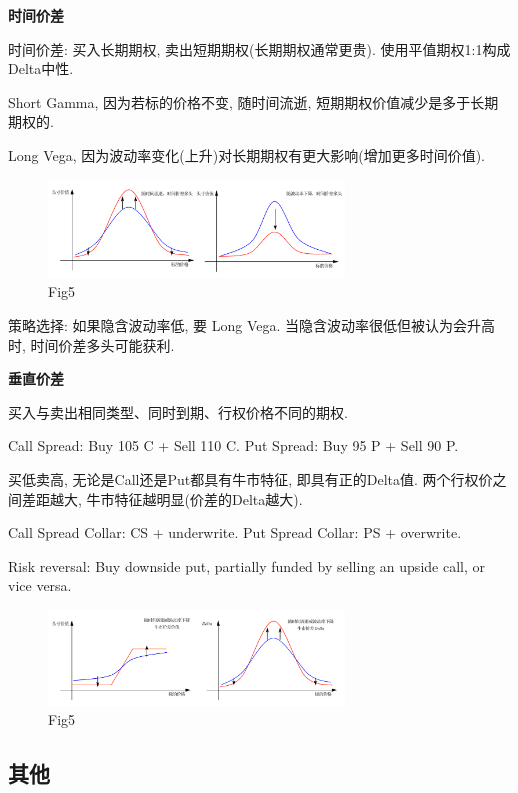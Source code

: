 \documentclass[UTF8]{ctexart}
\begin{document}
\noindent \textbf{时间价差} \par

时间价差: 买入长期期权, 卖出短期期权(长期期权通常更贵).
使用平值期权1:1构成Delta中性.

Short Gamma, 因为若标的价格不变, 随时间流逝, 短期期权价值减少是多于长期期权的.

Long Vega, 因为波动率变化(上升)对长期期权有更大影响(增加更多时间价值).

\begin{figure}[H]
	\centering
	\includegraphics[width=0.7\textwidth]{fig/fig5.png}
	\caption{Fig5}
\end{figure}

策略选择: 如果隐含波动率低, 要 Long Vega.
当隐含波动率很低但被认为会升高时, 时间价差多头可能获利.

\noindent \textbf{垂直价差} \par

买入与卖出相同类型、同时到期、行权价格不同的期权.

Call Spread: Buy 105 C + Sell 110 C.
Put Spread: Buy 95 P + Sell 90 P.

买低卖高, 无论是Call还是Put都具有牛市特征, 即具有正的Delta值.
两个行权价之间差距越大, 牛市特征越明显(价差的Delta越大).

Call Spread Collar: CS + underwrite.
Put Spread Collar: PS + overwrite.

Risk reversal: Buy downside put, partially funded by selling an upside call, or vice versa.

\begin{figure}[H]
	\centering
	\includegraphics[width=0.7\textwidth]{fig/fig6.png}
	\caption{Fig5}
\end{figure}


\subsection{其他}
\end{document}

